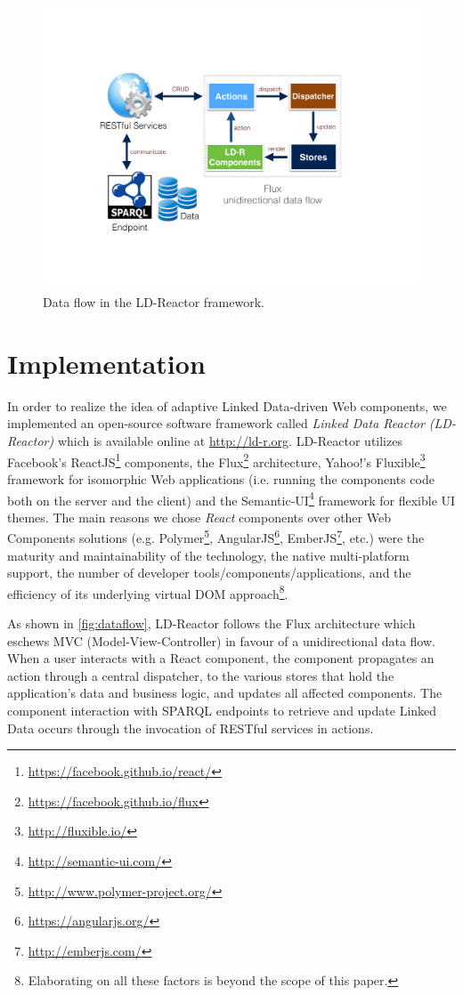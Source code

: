 \documentclass{acm_proc_article-sp}
\begin{document}
\begin{figure}[tb]
\center
  \includegraphics[width=.9\linewidth]{images/dataflow.pdf}
  \caption{Data flow in the LD-Reactor framework.}
  \label{fig:dataflow}
\end{figure}

\section{Implementation}
\label{sec:implementation}
In order to realize the idea of adaptive Linked Data-driven Web components, we implemented an open-source software framework called \emph{Linked Data Reactor (LD-Reactor)} which is available online at \url{http://ld-r.org}.
LD-Reactor utilizes Facebook's ReactJS\footnote{\url{https://facebook.github.io/react/}} components, the Flux\footnote{\url{https://facebook.github.io/flux}} architecture, Yahoo!'s Fluxible\footnote{\url{http://fluxible.io/}} framework for isomorphic Web applications (i.e. running the components code both on the server and the client) and the Semantic-UI\footnote{\url{http://semantic-ui.com/}} framework for flexible UI themes.
The main reasons we chose \emph{React} components over other  Web Components solutions (e.g. Polymer\footnote{\url{http://www.polymer-project.org/}}, AngularJS\footnote{\url{https://angularjs.org/}}, EmberJS\footnote{\url{http://emberjs.com/}}, etc.) were the maturity and maintainability of the technology, the native multi-platform support, the number of developer tools/components/applications, and the efficiency of its underlying virtual DOM approach\footnote{Elaborating on all these factors is beyond the scope of this paper.}.

As shown in \autoref{fig:dataflow}, LD-Reactor follows the Flux architecture which eschews MVC (Model-View-Controller) in favour of a unidirectional data flow. 
When a user interacts with a React component, the component propagates an action through a central dispatcher, to the various stores that hold the application's data and business logic, and updates all affected components. 
The component interaction with SPARQL endpoints to retrieve and update Linked Data occurs through the invocation of RESTful services in actions.
\end{document}
